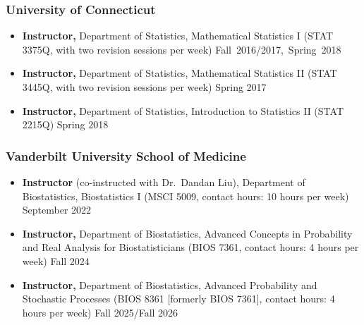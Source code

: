 \documentclass[12pt,letterpaper]{article}
\newenvironment{cventry}{\begin{minipage}[t]{\linewidth}}{\end{minipage}}
\begin{document}
	\subsubsection*{University of Connecticut}
	\begin{itemize}
		\item\begin{cventry} {\bf Instructor,} Department of Statistics, Mathematical 
		Statistics {\rm I} (STAT 3375Q, with two revision sessions per week) 
		\hfill 
		\mbox{Fall 2016/2017, Spring 2018}
		\par\end{cventry}
		\item\begin{cventry} {\bf Instructor,} Department of Statistics, Mathematical 
		Statistics {\rm II} (STAT 3445Q, with two revision sessions 
		per week) \hfill Spring 2017
		\par\end{cventry}
		\item\begin{cventry} {\bf Instructor,} Department of 
		Statistics, Introduction to Statistics {\rm II} (STAT 2215Q) 
		\hfill Spring 2018
		\par\end{cventry}
	\end{itemize}
	
	\subsubsection*{Vanderbilt University School of Medicine}
	\begin{itemize}
		\item\begin{cventry} {\bf Instructor} (co-instructed with Dr.\ Dandan Liu), 
		Department 
		of Biostatistics, Biostatistics {\rm I} (MSCI 5009, contact hours: 10 
		hours per week) \hfill September 2022
		\par\end{cventry}
		\item\begin{cventry} {\bf Instructor,} Department of Biostatistics, 
		Advanced Concepts in Probability and Real Analysis for 
		Biostatisticians (BIOS 7361, contact hours: 4 hours per 
		week) \hfill Fall 2024
		\par\end{cventry}
		\item\begin{cventry} {\bf Instructor,} Department of Biostatistics, 
		Advanced Probability and Stochastic Processes (BIOS 8361 
		[formerly BIOS 7361], contact hours: 4 hours per week) 
		\hfill Fall 2025/Fall 2026
		\par\end{cventry}
	\end{itemize}
	
\end{document}
